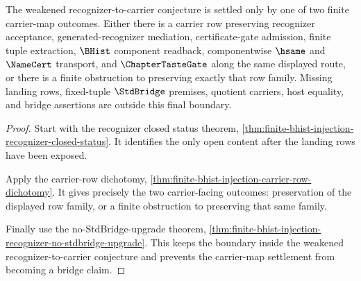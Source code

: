 \begin{theorem}
\label{thm:finite-bhist-injection-carrier-map-final-boundary}
The weakened recognizer-to-carrier conjecture is settled only by one of two finite carrier-map outcomes. Either there is a carrier row preserving recognizer acceptance, generated-recognizer mediation, certificate-gate admission, finite tuple extraction, $\BHist$ component readback, componentwise $\hsame$ and $\NameCert$ transport, and $\ChapterTasteGate$ along the same displayed route, or there is a finite obstruction to preserving exactly that row family. Missing landing rows, fixed-tuple $\StdBridge$ premises, quotient carriers, host equality, and bridge assertions are outside this final boundary.
\end{theorem}
\begin{proof}
Start with the recognizer closed status theorem, \autoref{thm:finite-bhist-injection-recognizer-closed-status}. It identifies the only open content after the landing rows have been exposed.

Apply the carrier-row dichotomy, \autoref{thm:finite-bhist-injection-carrier-row-dichotomy}. It gives precisely the two carrier-facing outcomes: preservation of the displayed row family, or a finite obstruction to preserving that same family.

Finally use the no-StdBridge-upgrade theorem, \autoref{thm:finite-bhist-injection-recognizer-no-stdbridge-upgrade}. This keeps the boundary inside the weakened recognizer-to-carrier conjecture and prevents the carrier-map settlement from becoming a bridge claim.
\end{proof}

